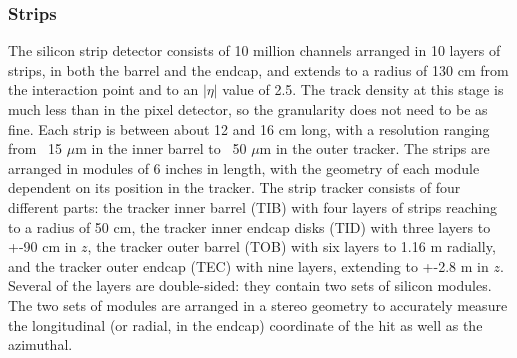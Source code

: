 \subsubsection{Strips}
\label{exp:strips}
The silicon strip detector consists of 10 million channels
arranged in 10 layers of strips, 
in both the barrel and the endcap,
and extends to a radius of 130 cm from the interaction point
and to an $|\eta|$ value of 2.5.  
The track density at this stage is much less than in the pixel detector,
so the granularity does not need to be as fine.
Each strip is between about 12 and 16 cm long,
with a resolution ranging from ~15 $\mu$m in the inner barrel
to ~50 $\mu$m in the outer tracker.  
The strips are arranged in modules of 6 inches in length, 
with the geometry of each module dependent 
on its position in the tracker.  
The strip tracker consists of four different parts: 
the tracker inner barrel (TIB) with four layers of strips reaching to a radius of 50 cm, 
the tracker inner endcap disks (TID) with three layers to +-90 cm in $z$, 
the tracker outer barrel (TOB) with six layers to 1.16 m radially, 
and the tracker outer endcap (TEC) with nine layers, extending to +-2.8 m in $z$. 
Several of the layers are double-sided: 
they contain two sets of silicon modules.  
The two sets of modules are arranged in a stereo
geometry to accurately measure the longitudinal
(or radial, in the endcap) coordinate of the hit 
as well as the azimuthal.  


